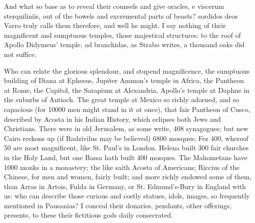 {And what so base as to reveal their counsels and give oracles, e
viscerum sterquiliniis, out of the bowels and excremental parts of
beasts? sordidos deos Varro truly calls them therefore, and well he
might. I say nothing of their magnificent and sumptuous temples, those
majestical structures: to the roof of Apollo Didymeus' temple, ad
branchidas, as Strabo writes, a thousand oaks did not suffice.

Who can relate the glorious splendour, and stupend magnificence, the
sumptuous building of Diana at Ephesus, Jupiter Ammon's temple in
Africa, the Pantheon at Rome, the Capitol, the Sarapium at Alexandria,
Apollo's temple at Daphne in the suburbs of Antioch. The great temple
at Mexico so richly adorned, and so capacious (for 10\thinspace{}000 men might
stand in it at once), that fair Pantheon of Cusco, described by Acosta
in his Indian History, which eclipses both Jews and Christians. There
were in old Jerusalem, as some write, 408 synagogues; but new Cairo
reckons up (if Radzivilus may be believed) 6800 mosques; Fez 400,
whereof 50 are most magnificent, like St. Paul's in London. Helena
built 300 fair churches in the Holy Land, but one Bassa hath built 400
mosques. The Mahometans have 1000 monks in a monastery; the like saith
Acosta of Americans; Riccius of the Chinese, for men and women, fairly
built; and more richly endowed some of them, than Arras in Artois,
Fulda in Germany, or St. Edmund's-Bury in England with us: who can
describe those curious and costly statues, idols, images, so frequently
mentioned in Pausanias? I conceal their donaries, pendants, other
offerings, presents, to these their fictitious gods daily consecrated.

}
